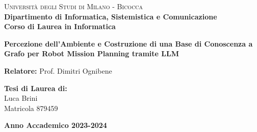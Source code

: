 


\begin{titlepage}

    \noindent
    \begin{minipage}[t]{0.19\textwidth}
    \end{minipage}
    \hspace{2mm}
    \begin{minipage}[t]{0.70\textwidth}
        {
            {\textsc{Università degli Studi di Milano - Bicocca}} \\
            \textbf{Dipartimento di Informatica, Sistemistica e Comunicazione} \\
            \textbf{Corso di Laurea in Informatica} \\
            \par
        }
    \end{minipage}

    \vspace{40mm}

    \begin{center}
        {\LARGE{
                \textbf{Percezione dell'Ambiente e Costruzione di una Base di Conoscenza a Grafo per Robot Mission Planning tramite LLM}
                \par
            }}
    \end{center}

    \vspace{50mm}

    \noindent
    {\large \textbf{Relatore:} Prof. Dimitri Ognibene } \\

    \vspace{15mm}

    \begin{flushright}
        {\large \textbf{Tesi di Laurea di:}} \\
        \large{Luca Brini} \\
        \large{Matricola 879459}
    \end{flushright}

    \vspace{20mm}
    \begin{center}
        {\large{\bf Anno Accademico 2023-2024}}
    \end{center}


\end{titlepage}

